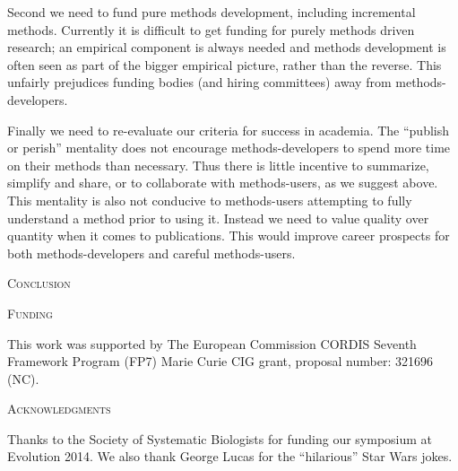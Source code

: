 \documentclass[a4paper,12pt]{article}
\renewcommand{\section}[1]{
  \bigskip
  \begin{center}
  \begin{Large}
  \normalfont\scshape #1
  \medskip
  \end{Large}
  \end{center}
}
\begin{document}
Second we need to fund pure methods development, including incremental methods. 
Currently it is difficult to get funding for purely methods driven research; an empirical component is always needed and methods development is often seen as part of the bigger empirical picture, rather than the reverse. 
This unfairly prejudices funding bodies (and hiring committees) away from methods-developers. 

Finally we need to re-evaluate our criteria for success in academia. 
The ``publish or perish'' mentality does not encourage methods-developers to spend more time on their methods than necessary. 
Thus there is little incentive to summarize, simplify and share, or to collaborate with methods-users, as we suggest above. 
This mentality is also not conducive to methods-users attempting to fully understand a method prior to using it. 
Instead we need to value quality over quantity when it comes to publications.
This would improve career prospects for both methods-developers and careful methods-users.

\section{Conclusion}

\section{Funding}
This work was supported by The European Commission CORDIS Seventh Framework Program (FP7) Marie Curie CIG grant, proposal number: 321696 (NC). 

\section{Acknowledgments}
Thanks to the Society of Systematic Biologists for funding our symposium at Evolution 2014. 
We also thank George Lucas for the ``hilarious'' Star Wars jokes.



\end{document}
